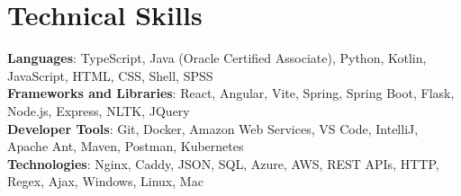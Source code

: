 \documentclass[letterpaper,10pt]{article}
\begin{document}
\section{Technical Skills}
\begin{itemize}[leftmargin=0.15in, label={}]
\small{\item{
\textbf{Languages}{: TypeScript, Java (Oracle Certified Associate), Python, Kotlin, JavaScript, HTML, CSS, Shell, SPSS} \\
\textbf{Frameworks and Libraries}{: React, Angular, Vite, Spring, Spring Boot, Flask, Node.js, Express, NLTK, JQuery} \\
\textbf{Developer Tools}{: Git, Docker, Amazon Web Services, VS Code, IntelliJ, Apache Ant, Maven, Postman, Kubernetes} \\
\textbf{Technologies}{: Nginx, Caddy, JSON, SQL, Azure, AWS, REST APIs, HTTP, Regex, Ajax, Windows, Linux, Mac} \\
}}
\end{itemize}


\end{document}
